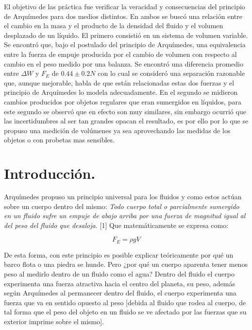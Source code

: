 \documentclass[a4paper]{article}
\begin{document}
El objetivo de las práctica fue verificar la veracidad y consecuencias del principio de Arquímedes para dos medios distintos. En ambos se buscó una relación entre el cambio en la masa y el producto de la densidad del fluido y el volumen desplazado de un líquido. El primero consistió en un sistema de volumen variable. Se encontró que, bajo el postulado del principio de Arquímedes, una equivalencia entre la fuerza de empuje producida por el cambio de volumen con respecto al cambio en el peso medido por una balanza. Se encontró una diferencia promedio entre $\Delta W$ y $F_{E}$ de $0.44\pm0.2N$ con lo cual se consideró una separación razonable que, aunque mejorable, habla de que están relacionadas estas dos fuerzas y el principio de Arquímedes lo modela adecuadamente. En el segundo se midieron cambios producidos por objetos regulares que eran sumergidos en líquidos, para este segundo se observó que en efecto son muy similares, sin embargo ocurrió que las incertidumbres al ser tan grandes opacan el resultado, es por ello por lo que se propuso una medición de volúmenes ya sea aprovechando las medidas de los objetos o con probetas mas sensibles.


\section*{Introducción.}
Arquímedes propuso un principio universal para los fluidos y como estos actúan sobre un cuerpo dentro del mismo: \textit{Todo cuerpo total o parcialmente sumergido en un fluido sufre un empuje de abajo arriba por una fuerza de magnitud igual al del peso del fluido que desaloja.} [1] Que matemáticamente se expresa como:

\begin{equation}
    F_E = \rho g V
\end{equation}

De esta forma, con este principio es posible explicar teóricamente por qué un barco flota o una piedra se hunde. Pero ¿por qué un cuerpo aparenta tener menos peso al medirlo dentro de un fluido como el agua? Dentro del fluido el cuerpo experimenta una fuerza atractiva hacia el centro del planeta, su  peso, además según Arquímedes al permanecer dentro del fluido, el cuerpo experimenta una fuerza que va en sentido opuesto al peso [debida al fluido que rodea al cuerpo, de tal forma que el peso del objeto en un fluido se ve afectado por las fuerzas que su exterior imprime sobre el mismo].
\end{document}
